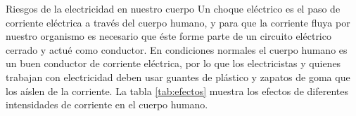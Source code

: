 \begin{sectionbox}{Riesgos de la electricidad en nuestro cuerpo}
Un choque eléctrico es el paso de corriente eléctrica a través del cuerpo humano,
y para que la corriente fluya por nuestro organismo es necesario que éste forme
parte de un circuito eléctrico cerrado y actué como conductor. En condiciones normales el cuerpo humano es un buen conductor de corriente eléctrica, por lo que los
electricistas y quienes trabajan con electricidad deben usar guantes de plástico y zapatos de goma que los aíslen de la corriente. La tabla \ref{tab:efectos} muestra los efectos de diferentes intensidades de corriente en el cuerpo humano.
\end{sectionbox}